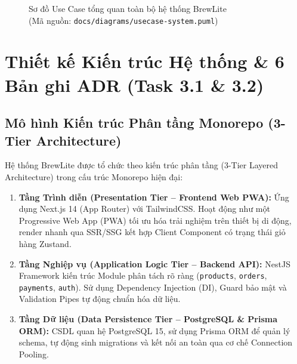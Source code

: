 \documentclass[a4paper]{article}
\begin{document}
\begin{figure}[H]
{
}
\caption{Sơ đồ Use Case tổng quan toàn bộ hệ thống BrewLite\\(Mã nguồn: \texttt{docs/diagrams/usecase-system.puml})}
\label{fig:usecase_system}
\end{figure}

\newpage
\section{Thiết kế Kiến trúc Hệ thống \& 6 Bản ghi ADR (Task 3.1 \& 3.2)}

\subsection{Mô hình Kiến trúc Phân tầng Monorepo (3-Tier Architecture)}
Hệ thống BrewLite được tổ chức theo kiến trúc phân tầng (3-Tier Layered Architecture) trong cấu trúc Monorepo hiện đại:
\begin{enumerate}
    \item \textbf{Tầng Trình diễn (Presentation Tier -- Frontend Web PWA):} Ứng dụng Next.js 14 (App Router) với TailwindCSS. Hoạt động như một Progressive Web App (PWA) tối ưu hóa trải nghiệm trên thiết bị di động, render nhanh qua SSR/SSG kết hợp Client Component có trạng thái giỏ hàng Zustand.
    \item \textbf{Tầng Nghiệp vụ (Application Logic Tier -- Backend API):} NestJS Framework kiến trúc Module phân tách rõ ràng (\texttt{products}, \texttt{orders}, \texttt{payments}, \texttt{auth}). Sử dụng Dependency Injection (DI), Guard bảo mật và Validation Pipes tự động chuẩn hóa dữ liệu.
    \item \textbf{Tầng Dữ liệu (Data Persistence Tier -- PostgreSQL \& Prisma ORM):} CSDL quan hệ PostgreSQL 15, sử dụng Prisma ORM để quản lý schema, tự động sinh migrations và kết nối an toàn qua cơ chế Connection Pooling.
\end{enumerate}
\end{document}
